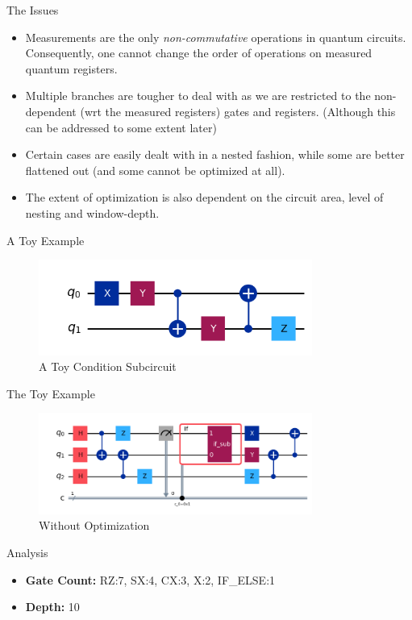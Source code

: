 \documentclass[10pt]{beamer}
\begin{document}
\begin{frame}{The Issues}
  \begin{itemize}
    \item Measurements are the only \emph{non-commutative} operations in quantum circuits. Consequently, one cannot change the order of operations on measured quantum registers.
    \item Multiple branches are tougher to deal with as we are restricted to the non-dependent (wrt the measured registers) gates and registers. (Although this can be addressed to some extent later)
    \item Certain cases are easily dealt with in a nested fashion, while some are better flattened out (and some cannot be optimized at all).
    \item The extent of optimization is also dependent on the circuit area, level of nesting and window-depth.
  \end{itemize}
\end{frame}

\begin{frame}{A Toy Example}
  \begin{figure}
    \centering
    \includegraphics[width=0.8\textwidth]{Images/cond.png}
    \caption{A Toy Condition Subcircuit}
  \end{figure}
\end{frame}

\begin{frame}{The Toy Example}
  \begin{figure}
    \centering
    \includegraphics[width=0.8\textwidth]{Images/toy1.png}
    \caption{Without Optimization}
  \end{figure}

  \begin{block}{Analysis}
    \begin{itemize}
      \item \textbf{Gate Count:} RZ:7, SX:4, CX:3, X:2, IF\_ELSE:1
      \item \textbf{Depth:} 10
    \end{itemize}
  \end{block}
\end{frame}
\end{document}
